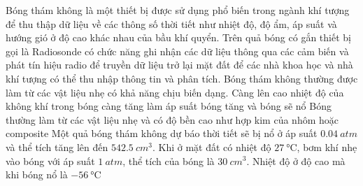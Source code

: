 \begin{ex}
	Bóng thám không là một thiết bị được sử dụng phổ biến trong ngành khí tượng để thu thập dữ liệu về các thông số thời tiết như nhiệt độ, độ ẩm, áp suất và hướng gió ở độ cao khác nhau của bầu khí quyển. Trên quả bóng có gắn thiết bị gọi là Radiosonde có chức năng ghi nhận các dữ liệu thông qua các cảm biến và phát tín hiệu radio để truyền dữ liệu trở lại mặt đất để các nhà khoa học và nhà khí tượng có thể thu nhập thông tin và phân tích. Bóng thám không thường được làm từ các vật liệu nhẹ có khả năng chịu biến dạng.
	{Càng lên cao nhiệt độ của không khí trong bóng càng tăng làm áp suất bóng tăng và bóng sẽ nổ}
	{Bóng thường làm từ các vật liệu nhẹ và có độ bền cao như hợp kim của nhôm hoặc composite}
	{\True Một quả bóng thám không dự báo thời tiết sẽ bị nổ ở áp suất $\SI{0.04}{atm}$ và thể tích tăng lên đến $\SI{542.5}{cm^3}$. Khi ở mặt đất có nhiệt độ $\SI{27}{\celsius}$, bơm khí nhẹ vào bóng với áp suất $\SI{1}{atm}$, thể tích của bóng là $\SI{30}{cm^3}$. Nhiệt độ ở độ cao mà khi bóng nổ là $\SI{-56}{\celsius}$}
\end{ex}

